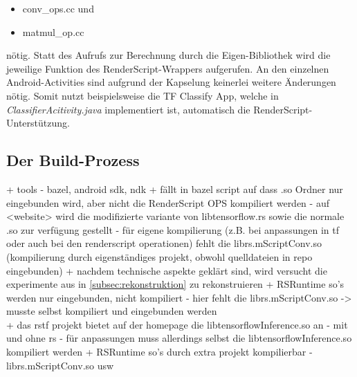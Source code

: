 \begin{itemize}
	\item conv\_ops.cc und
	\item matmul\_op.cc
\end{itemize}
nötig. Statt des Aufrufs zur Berechnung durch die Eigen-Bibliothek wird die jeweilige Funktion des RenderScript-Wrappers aufgerufen. An den einzelnen Android-Activities sind aufgrund der Kapselung keinerlei weitere Änderungen nötig. Somit nutzt beispielsweise die TF Classify App, welche in \textit{ClassifierAcitivity.java} implementiert ist, automatisch die RenderScript-Unterstützung. 

\subsection{Der Build-Prozess}
\label{subsec:buildprozess}

+ tools - bazel, android sdk, ndk
+ fällt in bazel script auf dass .so Ordner nur eingebunden wird, aber nicht die RenderScript OPS kompiliert werden
	- auf <website> wird die modifizierte variante von libtensorflow.rs sowie die normale .so zur verfügung gestellt
	- für eigene kompilierung (z.B. bei anpassungen in tf oder auch bei den renderscript operationen) fehlt die librs.mScriptConv.so (kompilierung durch eigenständiges projekt, obwohl quelldateien in repo eingebunden)
+ nachdem technische aspekte geklärt sind, wird versucht die experimente aus \cite{rstensorflow2017} in \ref{subsec:rekonstruktion} zu rekonstruieren 
+ RSRuntime so's werden nur eingebunden, nicht kompiliert
- hier fehlt die librs.mScriptConv.so -> musste selbst kompiliert und eingebunden werden\\

+ das rstf projekt bietet auf der homepage die libtensorflowInference.so an - mit und ohne rs
- für anpassungen muss allerdings selbst die libtensorflowInference.so kompiliert werden
+ RSRuntime so's durch extra projekt kompilierbar
- librs.mScriptConv.so usw 

